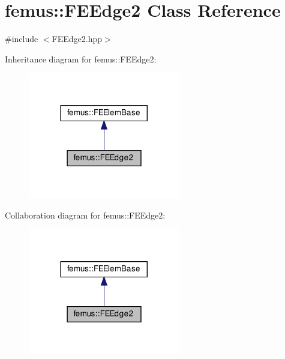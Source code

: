 \hypertarget{classfemus_1_1_f_e_edge2}{}\section{femus\+:\+:F\+E\+Edge2 Class Reference}
\label{classfemus_1_1_f_e_edge2}


{\ttfamily \#include $<$F\+E\+Edge2.\+hpp$>$}



Inheritance diagram for femus\+:\+:F\+E\+Edge2\+:
\nopagebreak
\begin{figure}[H]
\begin{center}
\leavevmode
\includegraphics[width=188pt]{classfemus_1_1_f_e_edge2__inherit__graph}
\end{center}
\end{figure}


Collaboration diagram for femus\+:\+:F\+E\+Edge2\+:
\nopagebreak
\begin{figure}[H]
\begin{center}
\leavevmode
\includegraphics[width=188pt]{classfemus_1_1_f_e_edge2__coll__graph}
\end{center}
\end{figure}
